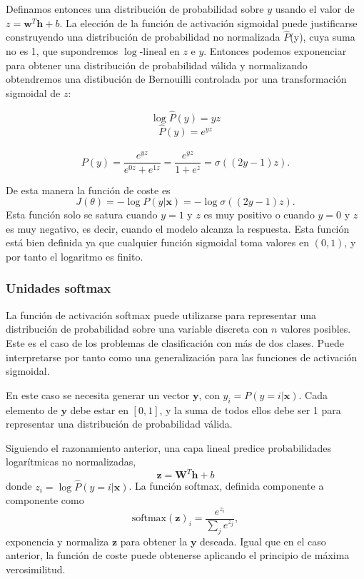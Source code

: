 Definamos entonces una distribución de probabilidad sobre $y$ usando el valor de $z = \textbf{w}^T\textbf{h} + b$. La elección de la función de activación sigmoidal puede justificarse construyendo una distribución de probabilidad no normalizada $\hat{P}$(y), cuya suma no es 1, que supondremos $\log$-lineal en $z$ e $y$. Entonces podemos exponenciar para obtener una distribución de probabilidad válida y normalizando obtendremos una distibución de Bernouilli controlada por una transformación sigmoidal de $z$:

$$\log \hat{P}(y) = yz$$ $$\hat{P}(y) = e^{yz}$$ \\ $$P(y) = \frac{e^{yz}}{e^{0z}+e^{1z}} = \frac{e^{yz}}{1+e^z} = \sigma((2y-1)z). $$

De esta manera la función de coste es $$J(\theta) = -\log P(y|\textbf{x}) = - \log \sigma((2y-1)z).$$ Esta función solo se satura cuando $y = 1$ y $z$ es muy positivo o cuando $y = 0$ y $z$ es muy negativo, es decir, cuando el modelo alcanza la respuesta. Esta función está bien definida ya que cualquier función sigmoidal toma valores en $(0,1)$, y por tanto el logaritmo es finito.

\subsubsection{Unidades softmax}

La función de activación softmax puede utilizarse para representar una distribución de probabilidad sobre una variable discreta con $n$ valores posibles. Este es el caso de los problemas de clasificación con más de dos clases. Puede interpretarse por tanto como una generalización para las funciones de activación sigmoidal.

En este caso se necesita generar un vector $\textbf{y}$, con $y_i = P(y = i| \textbf{x})$. Cada elemento de $\textbf{y}$ debe estar en $[0,1]$, y la suma de todos ellos debe ser 1 para representar una distribución de probabilidad válida.

Siguiendo el razonamiento anterior, una capa lineal predice probabilidades logarítmicas no normalizadas, $$\textbf{z} = \textbf{W}^T \textbf{h} + b$$ donde $z_i = \log \hat{P}(y = i | \textbf{x})$. La función softmax, definida componente a componente como $$\text{softmax}(\textbf{z})_i = \frac{e^{z_i}}{\sum_j e^{z_j}}, $$  exponencia y normaliza $\textbf{z}$ para obtener la $\textbf{y}$ deseada. Igual que en el caso anterior, la función de coste puede obtenerse aplicando el principio de máxima verosimilitud.

